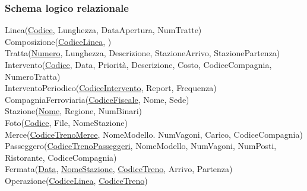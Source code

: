 \documentclass{article}
\begin{document}
\subsubsection*{Schema logico relazionale}
Linea(\underline{Codice}, Lunghezza, DataApertura, NumTratte) \vspace*{3pt}\\
Composizione(\underline{CodiceLinea}, ) \vspace*{3pt}\\
Tratta(\underline{Numero}, Lunghezza, Descrizione, StazioneArrivo, StazionePartenza) \vspace*{3pt}\\
Intervento(\underline{Codice}, Data, Priorità, Descrizione, Costo, CodiceCompagnia, NumeroTratta) \vspace*{3pt}\\
InterventoPeriodico(\underline{CodiceIntervento}, Report, Frequenza) \vspace*{3pt}\\
CompagniaFerroviaria(\underline{CodiceFiscale}, Nome, Sede) \vspace*{3pt}\\
Stazione(\underline{Nome}, Regione, NumBinari) \vspace*{3pt}\\
Foto(\underline{Codice}, File, NomeStazione) \vspace*{3pt}\\
Merce(\underline{CodiceTrenoMerce}, NomeModello. NumVagoni, Carico, CodiceCompagnia) \vspace*{3pt}\\
Passeggero(\underline{CodiceTrenoPasseggeri}, NomeModello, NumVagoni, NumPosti, Ristorante, CodiceCompagnia) \vspace*{3pt}\\
Fermata(\underline{Data}, \underline{NomeStazione}, \underline{CodiceTreno}, Arrivo, Partenza) \vspace*{3pt}\\
Operazione(\underline{CodiceLinea}, \underline{CodiceTreno}) \vspace*{3pt}\\
\end{document}

